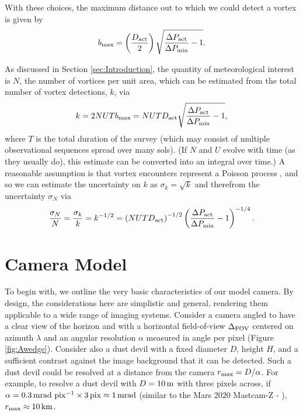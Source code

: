 \documentclass{aastex63}
\begin{document}
With these choices, the maximum distance out to which we could detect a vortex is given by
\begin{equation}
    b_{\rm max} = \left( \frac{D_{\rm act}}{2} \right) \sqrt{ \frac{\Delta P_{\rm act}}{\Delta P_{\rm min}} - 1 }. \label{eqn:bmax}
\end{equation} 

As discussed in Section \ref{sec:Introduction}, the quantity of meteorological interest is $N$, the number of vortices per unit area, which can be estimated from the total number of vortex detections, $k$, via
\begin{equation}
    k = 2 N U T b_{\rm max} = N U T D_{\rm act} \sqrt{ \frac{\Delta P_{\rm act}}{\Delta P_{\rm min}} - 1 }, \label{eqn:number_of_encounters}
\end{equation}
where $T$ is the total duration of the survey (which may consist of multiple observational sequences spread over many sols). (If $N$ and $U$ evolve with time (as they usually do), this estimate can be converted into an integral over time.) A reasonable assumption is that vortex encounters represent a Poisson process \citep[cf.][]{Press2007}, and so we can estimate the uncertainty on $k$ as $\sigma_k = \sqrt{k}$ and therefrom the uncertainty $\sigma_N$ via
\begin{equation}
    \frac{\sigma_N}{N} = \frac{\sigma_k}{k} = k^{-1/2} = \left ( N U T D_{\rm act} \right)^{-1/2} \left( \frac{\Delta P_{\rm act}}{\Delta P_{\rm min}} - 1 \right)^{-1/4}.
    \label{eqn:sigma_N}
\end{equation}

\section{Camera Model}
To begin with, we outline the very basic characteristics of our model camera. By design, the considerations here are simplistic and general, rendering them applicable to a wide range of imaging systems. Consider a camera angled to have a clear view of the horizon and with a horizontal field-of-view $\Delta_{\rm FOV}$ centered on azimuth $\lambda$ and an angular resolution $\alpha$ measured in angle per pixel (Figure \ref{fig:Awedge}). Consider also a dust devil with a fixed diameter $D$, height $H$, and a sufficient contrast against the image background that it can be detected. Such a dust devil could be resolved at a distance from the camera $r_{\rm max} = D/\alpha$. For example, to resolve a dust devil with $D = 10\,{\rm m}$ with three pixels across, if $\alpha = 0.3\,{\rm mrad\ pix^{-1}} \times 3\,{\rm pix} \approx 1\,{\rm mrad}$ (similar to the Mars 2020 Mastcam-Z - \citealp{2017E&SS....4..396B}), $r_{\rm max} \approx 10\,{\rm km}$.
\end{document}
